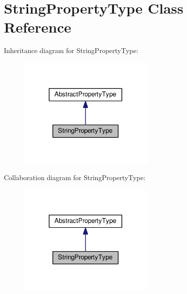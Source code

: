 \hypertarget{classStringPropertyType}{\section{String\+Property\+Type Class Reference}
\label{classStringPropertyType}
}


Inheritance diagram for String\+Property\+Type\+:\nopagebreak
\begin{figure}[H]
\begin{center}
\leavevmode
\includegraphics[width=192pt]{classStringPropertyType__inherit__graph}
\end{center}
\end{figure}


Collaboration diagram for String\+Property\+Type\+:\nopagebreak
\begin{figure}[H]
\begin{center}
\leavevmode
\includegraphics[width=192pt]{classStringPropertyType__coll__graph}
\end{center}
\end{figure}
